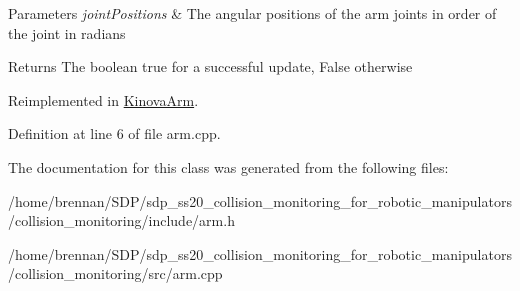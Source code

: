 \begin{DoxyParams}{Parameters}
{\em joint\+Positions} & The angular positions of the arm joints in order of the joint in radians \\
\hline
\end{DoxyParams}
\begin{DoxyReturn}{Returns}
The boolean true for a successful update, False otherwise 
\end{DoxyReturn}


Reimplemented in \hyperlink{class_kinova_arm_a3374988c7b3d9ae8773bc63f950629f7}{Kinova\+Arm}.



Definition at line 6 of file arm.\+cpp.



The documentation for this class was generated from the following files\+:\begin{DoxyCompactItemize}
\item 
/home/brennan/\+S\+D\+P/sdp\+\_\+ss20\+\_\+collision\+\_\+monitoring\+\_\+for\+\_\+robotic\+\_\+manipulators/collision\+\_\+monitoring/include/arm.\+h\item 
/home/brennan/\+S\+D\+P/sdp\+\_\+ss20\+\_\+collision\+\_\+monitoring\+\_\+for\+\_\+robotic\+\_\+manipulators/collision\+\_\+monitoring/src/arm.\+cpp\end{DoxyCompactItemize}
